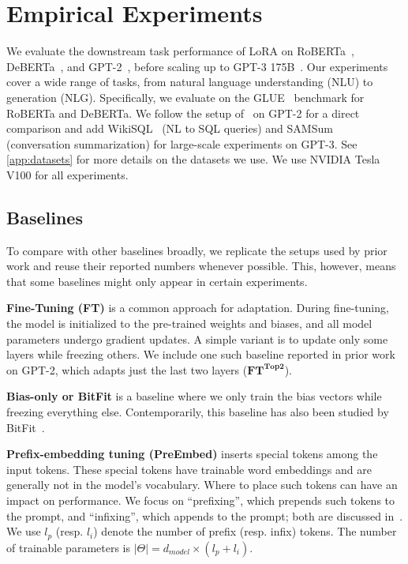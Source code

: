 \section{Empirical Experiments}
\label{sec:empirical}
We evaluate the downstream task performance of LoRA on RoBERTa~\citep{liu2019roberta}, DeBERTa~\citep{he2021deberta}, and GPT-2~\citep{radford_language_nodate}, before scaling up to GPT-3 175B~\citep{brown_language_2020}.
Our experiments cover a wide range of tasks, from natural language understanding (NLU) to generation (NLG).
Specifically, we evaluate on the GLUE~\citep{wang2019glue} benchmark for RoBERTa and DeBERTa.
We follow the setup of~\citet{li_prefix-tuning_2021} on GPT-2 for a direct comparison and add WikiSQL~\citep{DBLP:journals/corr/abs-1709-00103} (NL to SQL queries) and SAMSum~\citep{DBLP:journals/corr/abs-1911-12237} (conversation summarization) for large-scale experiments on GPT-3.
See \autoref{app:datasets} for more details on the datasets we use.
We use NVIDIA Tesla V100 for all experiments.

\subsection{Baselines}
\label{sec:expt_baselines}
To compare with other baselines broadly, we replicate the setups used by prior work and reuse their reported numbers whenever possible.
This, however, means that some baselines might only appear in certain experiments.

\textbf{Fine-Tuning (FT)} is a common approach for adaptation.
During fine-tuning, the model is initialized to the pre-trained weights and biases, and all model parameters undergo gradient updates.%
A simple variant is to update only some layers while freezing others.
We include one such baseline reported in prior work~\citep{li_prefix-tuning_2021} on GPT-2, which adapts just the last two layers ($\textbf{FT}^{\textbf{Top2}}$).

\textbf{Bias-only or BitFit} is a baseline where we only train the bias vectors while freezing everything else.
Contemporarily, this baseline has also been studied by BitFit~\citep{zaken2021bitfit}.

\textbf{Prefix-embedding tuning (PreEmbed)} inserts special tokens among the input tokens.
These special tokens have trainable word embeddings and are generally not in the model's vocabulary.
Where to place such tokens can have an impact on performance.
We focus on ``prefixing'', which prepends such tokens to the prompt, and ``infixing'', which appends to the prompt; both are discussed in~\citet{li_prefix-tuning_2021}.
We use $l_{p}$ (resp. $l_{i}$) denote the number of prefix (resp. infix) tokens.
The number of trainable parameters is $|\Theta| = d_{model} \times (l_p + l_i)$. 

